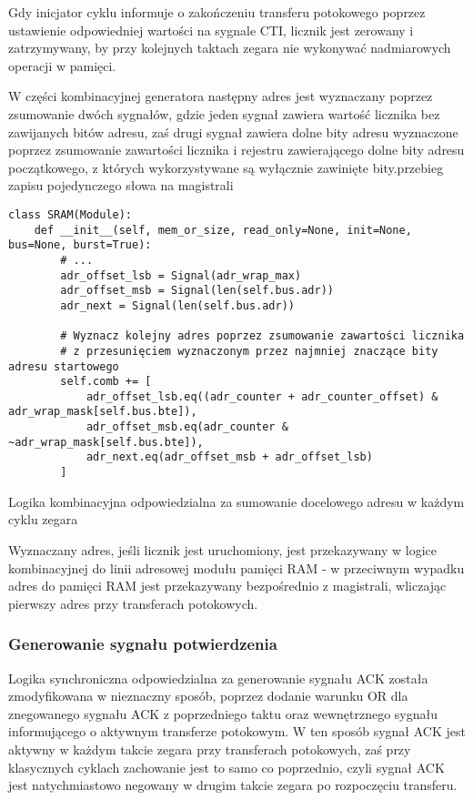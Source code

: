 Gdy inicjator cyklu informuje o zakończeniu transferu potokowego poprzez ustawienie odpowiedniej wartości na sygnale CTI, licznik jest zerowany i zatrzymywany, by przy kolejnych taktach zegara nie wykonywać nadmiarowych operacji w pamięci.

W części kombinacyjnej generatora następny adres jest wyznaczany poprzez zsumowanie dwóch sygnałów, gdzie jeden sygnał zawiera wartość licznika bez zawijanych bitów adresu, zaś drugi sygnał zawiera dolne bity adresu wyznaczone poprzez zsumowanie zawartości licznika i rejestru zawierającego dolne bity adresu początkowego, z których wykorzystywane są wyłącznie zawinięte bity.przebieg zapisu pojedynczego słowa na magistrali

\begin{listing}[H]
\begin{verbatim}
class SRAM(Module):
    def __init__(self, mem_or_size, read_only=None, init=None, bus=None, burst=True):
        # ...
        adr_offset_lsb = Signal(adr_wrap_max)
        adr_offset_msb = Signal(len(self.bus.adr))
        adr_next = Signal(len(self.bus.adr))

        # Wyznacz kolejny adres poprzez zsumowanie zawartości licznika
        # z przesunięciem wyznaczonym przez najmniej znaczące bity adresu startowego
        self.comb += [
            adr_offset_lsb.eq((adr_counter + adr_counter_offset) & adr_wrap_mask[self.bus.bte]),
            adr_offset_msb.eq(adr_counter & ~adr_wrap_mask[self.bus.bte]),
            adr_next.eq(adr_offset_msb + adr_offset_lsb)
        ]
\end{verbatim}
\caption{\label{lst:impl-sram-adrnext}Logika kombinacyjna odpowiedzialna za sumowanie docelowego adresu w każdym cyklu zegara}
\end{listing}

Wyznaczany adres, jeśli licznik jest uruchomiony, jest przekazywany w logice kombinacyjnej do linii adresowej modułu pamięci RAM - w przeciwnym wypadku adres do pamięci RAM jest przekazywany bezpośrednio z magistrali, wliczając pierwszy adres przy transferach potokowych.

\subsubsection{Generowanie sygnału potwierdzenia}

Logika synchroniczna odpowiedzialna za generowanie sygnału ACK została zmodyfikowana w nieznaczny sposób, poprzez dodanie warunku OR dla znegowanego sygnału ACK z poprzedniego taktu oraz wewnętrznego sygnału informującego o aktywnym transferze potokowym. W ten sposób sygnał ACK jest aktywny w każdym takcie zegara przy transferach potokowych, zaś przy klasycznych cyklach zachowanie jest to samo co poprzednio, czyli sygnał ACK jest natychmiastowo negowany w drugim takcie zegara po rozpoczęciu transferu.


